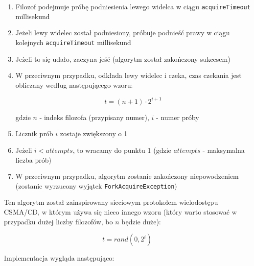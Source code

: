 \documentclass[11pt]{article}
\begin{document}
\begin{enumerate}
\def\labelenumi{\arabic{enumi}.}
\item
  Filozof podejmuje próbę podniesienia lewego widelca w ciągu
  \texttt{acquireTimeout} millisekund
\item
  Jeżeli lewy widelec został podniesiony, próbuje podnieść prawy w ciągu
  kolejnych \texttt{acquireTimeout} millisekund
\item
  Jeżeli to się udało, zaczyna jeść (algorytm został zakończony
  sukcesem)
\item
  W przeciwnym przypadku, odkłada lewy widelec i czeka, czas czekania
  jest obliczany według następującego wzoru:

  \[ t = (n + 1) \cdot 2^{i + 1} \]

  gdzie \(n\) - indeks filozofa (przypisany numer), \(i\) - numer próby
\item
  Licznik prób \(i\) zostaje zwiększony o 1
\item
  Jeżeli \(i < attempts\), to wracamy do punktu 1 (gdzie \(attempts\) -
  maksymalna liczba prób)
\item
  W przeciwnym przypadku, algorytm zostanie zakończony niepowodzeniem
  (zostanie wyrzucony wyjątek \texttt{ForkAcquireException})
\end{enumerate}

Ten algorytm został zainspirowany sieciowym protokołem wielodostępu
CSMA/CD, w którym używa się nieco innego wzoru (który warto stosować w
przypadku dużej liczby filozofów, bo \(n\) będzie duże):

\[ t = rand(0, 2^i) \]

Implementacja wygląda następująco:
\end{document}
